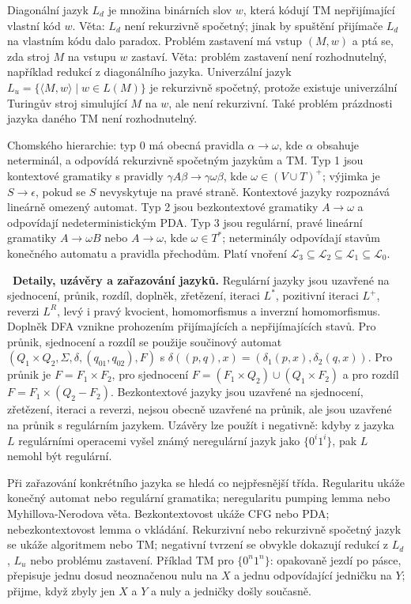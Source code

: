 \begin{odpoved}
Diagonální jazyk $L_d$ je množina binárních slov $w$, která kódují TM nepřijímající
vlastní kód $w$. Věta: $L_d$ není rekurzivně spočetný; jinak by spuštění přijímače
$L_d$ na vlastním kódu dalo paradox. Problém zastavení má vstup $(M,w)$ a ptá se,
zda stroj $M$ na vstupu $w$ zastaví. Věta: problém zastavení není rozhodnutelný,
například redukcí z diagonálního jazyka. Univerzální jazyk
$L_u=\{\langle M,w\rangle\mid w\in L(M)\}$ je rekurzivně spočetný, protože existuje
univerzální Turingův stroj simulující $M$ na $w$, ale není rekurzivní. Také problém
prázdnosti jazyka daného TM není rozhodnutelný.

Chomského hierarchie: typ 0 má obecná pravidla $\alpha\to\omega$, kde $\alpha$ obsahuje
neterminál, a odpovídá rekurzivně spočetným jazykům a TM. Typ 1 jsou kontextové
gramatiky s pravidly $\gamma A\beta\to\gamma\omega\beta$, kde $\omega\in(V\cup T)^+$;
výjimka je $S\to\epsilon$, pokud se $S$ nevyskytuje na pravé straně. Kontextové jazyky
rozpoznává lineárně omezený automat. Typ 2 jsou bezkontextové gramatiky $A\to\omega$ a
odpovídají nedeterministickým PDA. Typ 3 jsou regulární, pravé lineární gramatiky
$A\to\omega B$ nebo $A\to\omega$, kde $\omega\in T^*$; neterminály odpovídají stavům
konečného automatu a pravidla přechodům. Platí vnoření
$\mathcal L_3\subseteq\mathcal L_2\subseteq\mathcal L_1\subseteq\mathcal L_0$.

\noindent{}\ \textbf{Detaily, uzávěry a zařazování jazyků.}
Regulární jazyky jsou uzavřené na sjednocení, průnik, rozdíl, doplněk, zřetězení,
iteraci $L^*$, pozitivní iteraci $L^+$, reverzi $L^R$, levý i pravý kvocient, homomorfismus
a inverzní homomorfismus. Doplněk DFA vznikne prohozením přijímajících a nepřijímajících
stavů. Pro průnik, sjednocení a rozdíl se použije součinový automat
$(Q_1\times Q_2,\Sigma,\delta,(q_{01},q_{02}),F)$ s
$\delta((p,q),x)=(\delta_1(p,x),\delta_2(q,x))$. Pro průnik je
$F=F_1\times F_2$, pro sjednocení
$F=(F_1\times Q_2)\cup(Q_1\times F_2)$ a pro rozdíl $F=F_1\times(Q_2-F_2)$.
Bezkontextové jazyky jsou uzavřené na sjednocení, zřetězení, iteraci a reverzi, nejsou
obecně uzavřené na průnik, ale jsou uzavřené na průnik s regulárním jazykem. Uzávěry
lze použít i negativně: kdyby z jazyka $L$ regulárními operacemi vyšel známý neregulární
jazyk jako $\{0^i1^i\}$, pak $L$ nemohl být regulární.

Při zařazování konkrétního jazyka se hledá co nejpřesnější třída. Regularitu ukáže
konečný automat nebo regulární gramatika; neregularitu pumping lemma nebo
Myhillova-Nerodova věta. Bezkontextovost ukáže CFG nebo PDA; nebezkontextovost lemma
o vkládání. Rekurzivní nebo rekurzivně spočetný jazyk se ukáže algoritmem nebo TM;
negativní tvrzení se obvykle dokazují redukcí z $L_d$, $L_u$ nebo problému zastavení.
Příklad TM pro $\{0^n1^n\}$: opakovaně jezdí po pásce, přepisuje jednu dosud
neoznačenou nulu na $X$ a jednu odpovídající jedničku na $Y$; přijme, když zbyly jen
$X$ a $Y$ a nuly a jedničky došly současně.


\end{odpoved}
